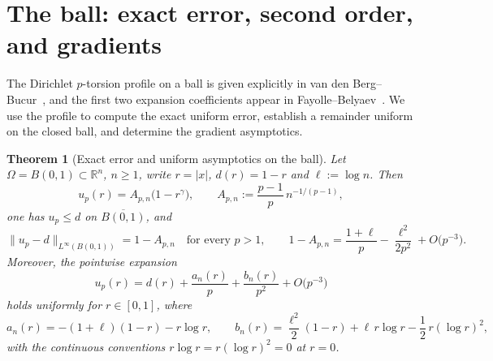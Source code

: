 \documentclass[11pt]{article}
\newcommand{\R}{\mathbb R}
\newcommand{\abs}[1]{\lvert #1\rvert}
\newcommand{\norm}[1]{\lVert #1\rVert}
\newtheorem{theorem}{Theorem}[section]
\theoremstyle{definition}
\theoremstyle{remark}
\begin{document}
\section{The ball: exact error, second order, and gradients}\label{sec:ball}
The Dirichlet $p$-torsion profile on a ball is given explicitly in van den
Berg--Bucur~\cite[Section~4.2]{VdBB2014}, and the first two expansion
coefficients appear in Fayolle--Belyaev~\cite[Appendix~B]{FB2026}. We use the
profile to compute the exact uniform error, establish a remainder uniform on
the closed ball, and determine the gradient asymptotics.
\begin{theorem}[Exact error and uniform asymptotics on the ball]\label{thm:ball}
Let $\Omega=B(0,1)\subset\R^n$, $n\ge1$, write $r=\abs{x}$, $d(r)=1-r$ and
$\ell:=\log n$. Then
\begin{equation}\label{eq:ball-profile}
u_p(r)=A_{p,n}\bigl(1-r^{\gamma}\bigr),
\qquad
A_{p,n}:=\frac{p-1}{p}\,n^{-1/(p-1)},
\end{equation}
one has $u_p\le d$ on $\overline{B(0,1)}$, and
\begin{equation}\label{eq:ball-exact}
\norm{u_p-d}_{L^\infty(B(0,1))}=1-A_{p,n}
\quad\text{for every }p>1,
\qquad
1-A_{p,n}
=\frac{1+\ell}{p}-\frac{\ell^{2}}{2p^{2}}+O\bigl(p^{-3}\bigr).
\end{equation}
Moreover, the pointwise expansion
\begin{equation}\label{eq:ball-second-order}
u_p(r)=d(r)+\frac{a_n(r)}{p}+\frac{b_n(r)}{p^{2}}+O\bigl(p^{-3}\bigr)
\end{equation}
holds uniformly for $r\in[0,1]$, where
\[
a_n(r)=-(1+\ell)(1-r)-r\log r,
\qquad
b_n(r)=\frac{\ell^{2}}{2}(1-r)+\ell\,r\log r-\frac12\,r(\log r)^{2},
\]
with the continuous conventions $r\log r=r(\log r)^2=0$ at $r=0$.
\end{theorem}
\end{document}
